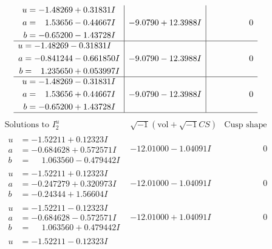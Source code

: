 \documentclass[1p]{elsarticle_modified}
\theoremstyle{definition}
\newcommand{\I}{\sqrt{-1}}
\begin{document}
$$\begin{array}{c|c|c}
\begin{aligned}
u &= -1.48269 + 0.31831 I \\
a &= \phantom{-}1.53656 - 0.44667 I \\
b &= -0.65200 - 1.43728 I\end{aligned}
 & -9.0790 + 12.3988 I & \phantom{-0.000000 } 0 \\ \hline\begin{aligned}
u &= -1.48269 - 0.31831 I \\
a &= -0.841244 - 0.661850 I \\
b &= \phantom{-}1.235650 + 0.053997 I\end{aligned}
 & -9.0790 - 12.3988 I & \phantom{-0.000000 } 0 \\ \hline\begin{aligned}
u &= -1.48269 - 0.31831 I \\
a &= \phantom{-}1.53656 + 0.44667 I \\
b &= -0.65200 + 1.43728 I\end{aligned}
 & -9.0790 - 12.3988 I & \phantom{-0.000000 } 0\\
 \hline 
 \end{array}$$\newpage$$\begin{array}{c|c|c}  
\text{Solutions to }I^u_{2}& \I (\text{vol} + \sqrt{-1}CS) & \text{Cusp shape}\\
 \hline 
\begin{aligned}
u &= -1.52211 + 0.12323 I \\
a &= -0.684628 + 0.572571 I \\
b &= \phantom{-}1.063560 - 0.479442 I\end{aligned}
 & -12.01000 - 1.04091 I & \phantom{-0.000000 } 0 \\ \hline\begin{aligned}
u &= -1.52211 + 0.12323 I \\
a &= -0.247279 + 0.320973 I \\
b &= -0.24344 + 1.56604 I\end{aligned}
 & -12.01000 - 1.04091 I & \phantom{-0.000000 } 0 \\ \hline\begin{aligned}
u &= -1.52211 - 0.12323 I \\
a &= -0.684628 - 0.572571 I \\
b &= \phantom{-}1.063560 + 0.479442 I\end{aligned}
 & -12.01000 + 1.04091 I & \phantom{-0.000000 } 0 \\ \hline\begin{aligned}
u &= -1.52211 - 0.12323 I \\

\end{aligned}
\end{array}$$
\end{document}
